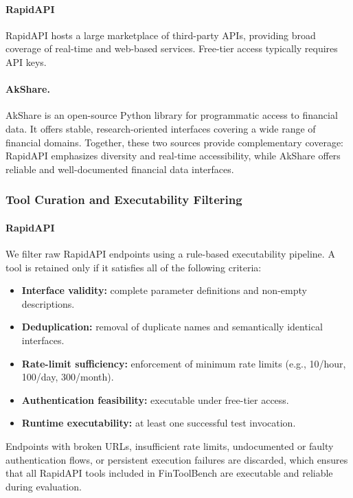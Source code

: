 \documentclass[sigconf,nonacm]{acmart}
\begin{document}
\paragraph{RapidAPI}
RapidAPI hosts a large marketplace of third-party APIs, providing broad coverage of real-time and web-based services. Free-tier access typically requires API keys.

\paragraph{AkShare.}
AkShare is an open-source Python library for programmatic access to financial data. It offers stable, research-oriented interfaces covering a wide range of financial domains.
Together, these two sources provide complementary coverage: RapidAPI emphasizes diversity and real-time accessibility, while AkShare offers reliable and well-documented financial data interfaces.
\subsubsection{Tool Curation and Executability Filtering}
\label{subsec:executability}

\paragraph{RapidAPI}
We filter raw RapidAPI endpoints using a rule-based executability pipeline.
A tool is retained only if it satisfies all of the following criteria:

\begin{itemize}
  \item \textbf{Interface validity:} complete parameter definitions and non-empty descriptions.
  \item \textbf{Deduplication:} removal of duplicate names and semantically identical interfaces.
  \item \textbf{Rate-limit sufficiency:} enforcement of minimum rate limits (e.g., 10/hour, 100/day, 300/month).
  \item \textbf{Authentication feasibility:} executable under free-tier access.
  \item \textbf{Runtime executability:} at least one successful test invocation.
\end{itemize}

Endpoints with broken URLs, insufficient rate limits, undocumented or faulty authentication flows,
or persistent execution failures are discarded, which ensures that all RapidAPI tools included in FinToolBench are executable and reliable during evaluation.
\end{document}
